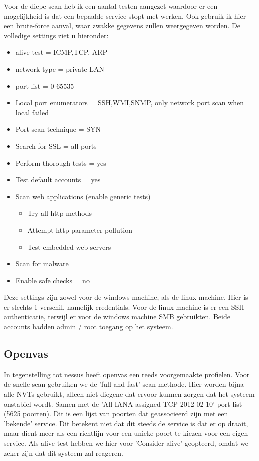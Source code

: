 Voor de diepe scan heb ik een aantal testen aangezet waardoor er een mogelijkheid is dat een bepaalde service stopt met werken. Ook gebruik ik hier een brute-force aanval, waar zwakke gegevens zullen weergegeven worden. De volledige settings ziet u hieronder:

\begin{itemize}
\item alive test = ICMP,TCP, ARP
\item network type = private LAN
\item port list = 0-65535
\item Local port enumerators = SSH,WMI,SNMP, only network port scan when local failed
\item Port scan technique = SYN
\item Search for SSL = all ports
\item Perform thorough tests = yes
\item Test default accounts = yes
\item Scan web applications (enable generic tests)
\begin{itemize}
\item Try all http methods
\item Attempt http parameter pollution
\item Test embedded web servers
\end{itemize}
\item Scan for malware
\item Enable safe checks = no
\end{itemize}

Deze settings zijn zowel voor de windows machine, als de linux machine. Hier is er slechts 1 verschil, namelijk credentials. Voor de linux machine is er een SSH authenticatie, terwijl er voor de windows machine SMB gebruikten. Beide accounts hadden admin / root toegang op het systeem.

\subsection{Openvas}

In tegenstelling tot nessus heeft openvas een reeds voorgemaakte profielen. Voor de snelle scan gebruiken we de 'full and fast' scan methode. Hier worden bijna alle NVTs gebruikt, alleen niet diegene dat ervoor kunnen zorgen dat het systeem onstabiel wordt. Samen met de 'All IANA assigned TCP 2012-02-10' port list (5625 poorten). Dit is een lijst van poorten dat geassocieerd zijn met een 'bekende' service. Dit betekent niet dat dit steeds de service is dat er op draait, maar dient meer als een richtlijn voor een unieke poort te kiezen voor een eigen service. Als alive test hebben we hier voor 'Consider alive' geopteerd, omdat we zeker zijn dat dit systeem zal reageren.

